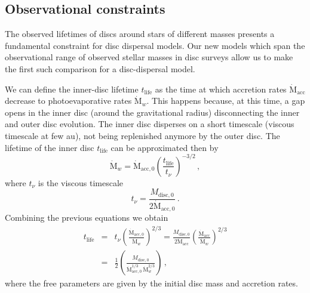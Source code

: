 \documentclass[usenatbib,useAMS,usedcolumn]{mnras}
\begin{document}
\subsection{Observational constraints}
The observed lifetimes of discs around stars of different masses presents a fundamental constraint for disc dispersal models. Our new models which span the observational range of observed stellar masses in disc surveys allow us to make the first such comparison for a disc-dispersal model.

We can define the inner-disc lifetime $t_\mathrm{life}$ as the time at which accretion rates $\dot{\mathrm{M}}_\mathrm{acc}$ decrease to photoevaporative rates $\dot{\mathrm{M}}_w$.
This happens because, at this time, a gap opens in the inner disc (around the gravitational radius) disconnecting the inner and outer disc evolution. 
The inner disc disperses on a short timescale (viscous timescale at few \si{\astronomicalunit}), not being replenished anymore by the outer disc.
The lifetime of the inner disc $t_\mathrm{life}$ can be approximated then by
\begin{equation}\label{eq:tlifedef}
    \dot{\mathrm{M}}_w = \dot{\mathrm{M}}_\mathrm{acc,0}\left(\frac{t_\mathrm{life}}{t_\nu}\right)^{-3/2}\, ,
\end{equation}
where $t_\nu$ is the viscous timescale
\begin{equation}
    t_\nu = \frac{M_\mathrm{disc,0}}{2 \dot{\mathrm{M}}_\mathrm{acc,0}}\, .
\end{equation}
Combining the previous equations we obtain
\begin{eqnarray}\label{eq:tlife}
    t_\mathrm{life} &=& t_\nu \left(\frac{\dot{\mathrm{M}}_\mathrm{acc,0}}{\dot{\mathrm{M}}_w}\right)^{2/3} = \frac{M_\mathrm{disc,0}}{2 \dot{\mathrm{M}}_\mathrm{acc}}\left(\frac{\dot{\mathrm{M}}_\mathrm{acc}}{\dot{\mathrm{M}}_w}\right)^{2/3} \nonumber \\
    &=& \frac{1}{2}\left(\frac{M_\mathrm{disc,0}}{\dot{\mathrm{M}}_\mathrm{acc,0}^{1/3}\,\dot{\mathrm{M}}_w^{2/3}}\right)\, ,
\end{eqnarray}
where the free parameters are given by the initial disc mass and accretion rates.
\end{document}
